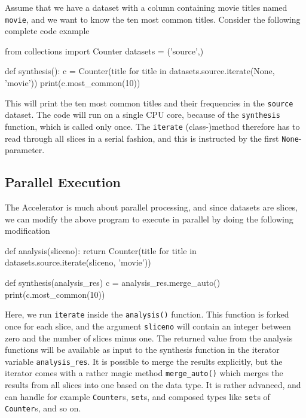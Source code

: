 \documentclass[a4paper]{article}
\begin{document}
Assume that we have a dataset with a column containing movie titles
named \texttt{movie}, and we want to know the ten most common titles.
Consider the following complete code example
\begin{python}
from collections import Counter
datasets = ('source',)

def synthesis():
    c = Counter(title for title in datasets.source.iterate(None, 'movie'))
    print(c.most_common(10))
\end{python}
This will print the ten most common titles and their
frequencies in the \texttt{source} dataset.  The code will run on a
single CPU core, because of the \texttt{synthesis} function, which is
called only once.  The \texttt{iterate} (class-)method therefore has
to read through all slices in a serial fashion, and this is instructed
by the first \texttt{None}-parameter.



\subsection{Parallel Execution}
The Accelerator is much about parallel processing, and since datasets
are slices, we can modify the above program to execute in parallel by
doing the following modification
\begin{python}
def analysis(sliceno):
    return Counter(title for title in datasets.source.iterate(sliceno, 'movie'))

def synthesis(analysis_res)
    c = analysis_res.merge_auto()
    print(c.most_common(10))
\end{python}
Here, we run \texttt{iterate} inside the \texttt{analysis()} function.
This function is forked once for each slice, and the argument
\texttt{sliceno} will contain an integer between zero and the number
of slices minus one.  The returned value from the analysis functions
will be available as input to the synthesis function in the iterator
variable \texttt{analysis\_res}.  It is possible to merge the results
explicitly, but the iterator comes with a rather magic method
\texttt{merge\_auto()} which merges the results from all slices into
one based on the data type.  It is rather advanced, and can handle for
example \texttt{Counter}s, \texttt{set}s, and composed types like
\texttt{set}s of \texttt{Counter}s, and so on.

\clearpage
\end{document}
